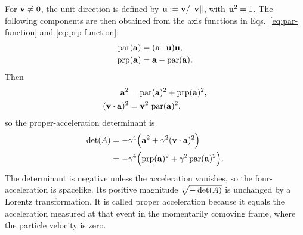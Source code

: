 For \(\mathbf{v}\neq 0\), the unit direction is defined by
\(\mathbf{u}:=\mathbf{v}/\|\mathbf{v}\|\), with \(\mathbf{u}^2=1\). The following
components are then obtained from the axis functions in
Eqs.\ \eqref{eq:par-function} and \eqref{eq:prp-function}:
\begin{align*}
\operatorname{par}(\mathbf{a})&=(\mathbf{a}\cdot\mathbf{u})\mathbf{u},\\
\operatorname{prp}(\mathbf{a})&=\mathbf{a}-\operatorname{par}(\mathbf{a}).
\end{align*}
Then
\begin{align*}
\mathbf{a}^2&=\operatorname{par}(\mathbf{a})^2+\operatorname{prp}(\mathbf{a})^2,\\
(\mathbf{v}\cdot\mathbf{a})^2&=\mathbf{v}^2\,\operatorname{par}(\mathbf{a})^2,
\end{align*}
so the proper-acceleration determinant is
\begin{align*}
\operatorname{det}\!\left(A\right)
&=-\gamma^4\Bigl(\mathbf{a}^2+\gamma^2(\mathbf{v}\cdot\mathbf{a})^2\Bigr)\notag\\
&=-\gamma^4\Bigl(\operatorname{prp}(\mathbf{a})^2+\gamma^2\operatorname{par}(\mathbf{a})^2\Bigr).
\end{align*}
The determinant is negative unless the acceleration vanishes, so the
four-acceleration is spacelike. Its positive magnitude
\(\sqrt{-\operatorname{det}\!\left(A\right)}\) is unchanged by a Lorentz transformation. It is
called proper acceleration because it equals the acceleration measured at
that event in the momentarily comoving frame, where the particle velocity is
zero.

